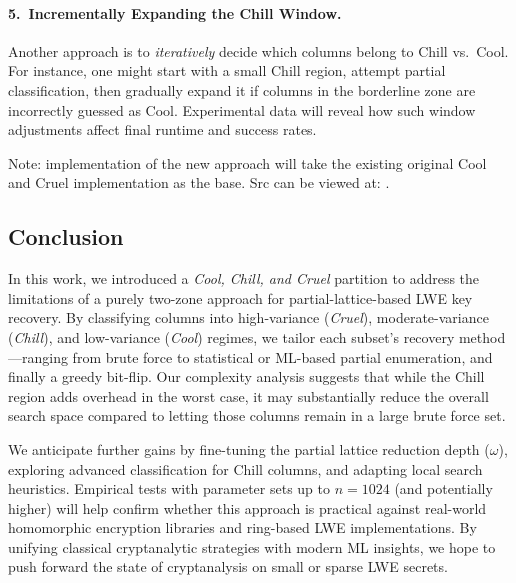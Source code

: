 \documentclass[conference]{IEEEtran}
\begin{document}
\paragraph{5.\ Incrementally Expanding the Chill Window.}
Another approach is to \emph{iteratively} decide which columns belong to Chill vs.\ Cool. For instance, one might start with a small Chill region, attempt partial classification, then gradually expand it if columns in the borderline zone are incorrectly guessed as Cool. Experimental data will reveal how such window adjustments affect final runtime and success rates.

\begingroup
Note: implementation of the new approach will take the existing original Cool and Cruel implementation as the base. Src can be viewed at: \cite{lwe-benchmarking}.
\endgroup

\subsection{Conclusion}
In this work, we introduced a \emph{Cool, Chill, and Cruel} partition to address the limitations of a purely two-zone approach for partial-lattice-based LWE key recovery. By classifying columns into high-variance (\emph{Cruel}), moderate-variance (\emph{Chill}), and low-variance (\emph{Cool}) regimes, we tailor each subset’s recovery method—ranging from brute force to statistical or ML-based partial enumeration, and finally a greedy bit-flip. Our complexity analysis suggests that while the Chill region adds overhead in the worst case, it may substantially reduce the overall search space compared to letting those columns remain in a large brute force set.

We anticipate further gains by fine-tuning the partial lattice reduction depth ($\omega$), exploring advanced classification for Chill columns, and adapting local search heuristics. Empirical tests with parameter sets up to $n=1024$ (and potentially higher) will help confirm whether this approach is practical against real-world homomorphic encryption libraries and ring-based LWE implementations. By unifying classical cryptanalytic strategies with modern ML insights, we hope to push forward the state of cryptanalysis on small or sparse LWE secrets.

  
  
\end{document}

